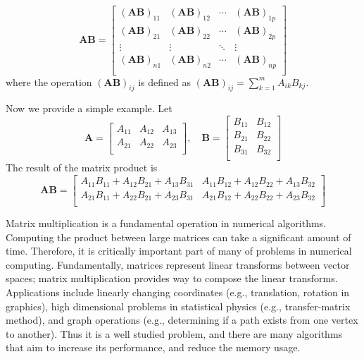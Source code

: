 \begin{equation}
\mathbf{AB} = \begin{bmatrix}
 \left(\mathbf{AB}\right)_{11} & \left(\mathbf{AB}\right)_{12} & \cdots & \left(\mathbf{AB}\right)_{1p} \\
 \left(\mathbf{AB}\right)_{21} & \left(\mathbf{AB}\right)_{22} & \cdots & \left(\mathbf{AB}\right)_{2p} \\
\vdots & \vdots & \ddots & \vdots \\
 \left(\mathbf{AB}\right)_{n1} & \left(\mathbf{AB}\right)_{n2} & \cdots & \left(\mathbf{AB}\right)_{np} \\
\end{bmatrix}
\end{equation} where the operation $\left(\mathbf{AB}\right)_{ij}$ is defined as $\left(\mathbf{A}\mathbf{B}\right)_{ij} = \sum_{k=1}^m A_{ik}B_{kj}$.

Now we provide a simple example. Let
\begin{equation}
\mathbf{A} =
 \begin{bmatrix}
 \label{eq:ABmatrix}
  A_{11} & A_{12}  &  A_{13} \\
  A_{21} & A_{22} & A_{23} \\
 \end{bmatrix},  \quad
\mathbf{B} =
 \begin{bmatrix}
  B_{11} & B_{12}  \\
  B_{21} & B_{22}   \\
   B_{31} & B_{32}  \\
 \end{bmatrix}
\end{equation}
The result of the matrix product is
\begin{equation}\label{eq:ABmatrix_product}\mathbf{AB} = \begin{bmatrix}
 A_{11}B_{11} + A_{12}B_{21} + A_{13}B_{31} & A_{11}B_{12} + A_{12}B_{22} + A_{13}B_{32} \\
 A_{21}B_{11} + A_{22}B_{21} + A_{23}B_{31} & A_{21}B_{12} + A_{22}B_{22} + A_{23}B_{32}\\
\end{bmatrix}
\end{equation}

Matrix multiplication is a fundamental operation in numerical algorithms. Computing the product between large matrices can take a significant amount of time. Therefore, it is critically important part of many of problems in numerical computing. Fundamentally, matrices represent linear transforms between vector spaces; matrix multiplication provides way to compose the linear transforms.  Applications include linearly changing coordinates (e.g., translation, rotation in graphics), high dimensional problems in statistical physics (e.g., transfer-matrix method), and graph operations (e.g., determining if a path exists from one vertex to another). Thus it is a well studied problem, and there are many algorithms that aim to increase its performance, and reduce the memory usage.

